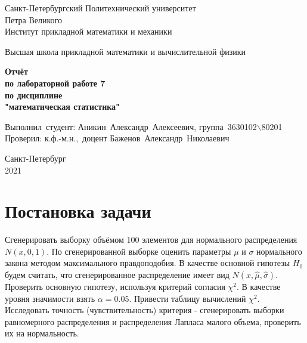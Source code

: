\documentclass[12pt,a4paper]{article}
\begin{document}
	
	\begin{titlepage}
		
		\begin{center}
			\begin{large}
				Санкт-Петербургский Политехнический университет\\ Петра Великого\\
				Институт прикладной математики и механики\\
			\end{large}
			\vspace{0.2cm}
			Высшая школа прикладной математики и вычислительной физики\\
			
		\end{center}
		
		\vspace{3cm}
		\begin{center}
			\textbf{Отчёт\\ по лабораторной работе 7\\ по дисциплине\\ "математическая статистика"}
		\end{center}
		
		\vspace{3cm}
		\vbox{%
			\hfill%
			\vbox{%
				\hbox{Выполнил студент:}%
				\hbox{\break}
				\hbox{Аникин Александр Алексеевич,}%
				\hbox{группа 3630102$\backslash$80201}%
				\hbox{\break}
				\hbox{\break}
				\hbox{Проверил:}
				\hbox{\break}
				\hbox{к.ф.-м.н., доцент}
				\hbox{Баженов Александр Николаевич}
			}%
		} 
		\vfill
		
		\begin{center}
			Санкт-Петербург\\2021
		\end{center}
		
	\end{titlepage}
	\tableofcontents
	\newpage
	
	\listoftables
	\newpage	
	
	\section{Постановка задачи}
		Сгенерировать выборку объёмом 100 элементов для нормального распределения $N(x, 0, 1)$. По сгенерированной выборке оценить параметры $\mu$ и $\sigma$ нормального закона методом максимального правдоподобия.
		В качестве основной гипотезы $H_0$ будем считать, что сгенерированное
		распределение имеет вид $N(x, \hat{\mu},\hat{\sigma})$. Проверить основную гипотезу, используя критерий согласия $\chi^2$. В качестве уровня значимости взять $\alpha = 0.05$. Привести таблицу вычислений $\chi^2$.
		Исследовать точность (чувствительность) критерия - сгенерировать выборки равномерного распределения и распределения Лапласа малого объема, проверить их на нормальность.
		\newpage
	
\end{document}
